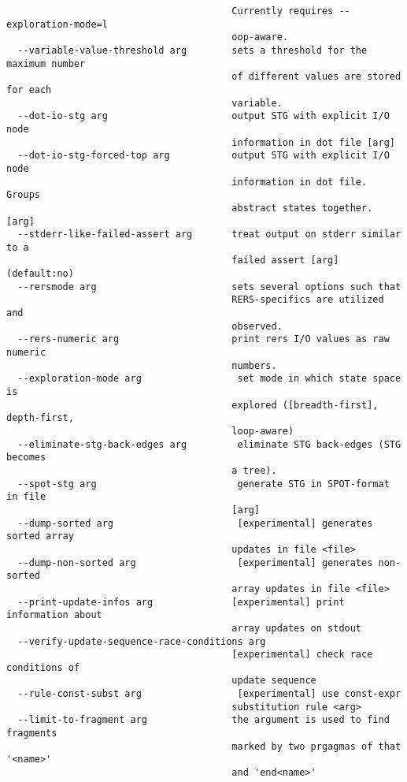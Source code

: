 \documentclass[natbib]{article}
\begin{document}
\begin{verbatim}
                                        Currently requires --exploration-mode=l
                                        oop-aware.
  --variable-value-threshold arg        sets a threshold for the maximum number
                                        of different values are stored for each
                                        variable.
  --dot-io-stg arg                      output STG with explicit I/O node 
                                        information in dot file [arg]
  --dot-io-stg-forced-top arg           output STG with explicit I/O node 
                                        information in dot file. Groups 
                                        abstract states together. [arg]
  --stderr-like-failed-assert arg       treat output on stderr similar to a 
                                        failed assert [arg] (default:no)
  --rersmode arg                        sets several options such that 
                                        RERS-specifics are utilized and 
                                        observed.
  --rers-numeric arg                    print rers I/O values as raw numeric 
                                        numbers.
  --exploration-mode arg                 set mode in which state space is 
                                        explored ([breadth-first], depth-first,
                                        loop-aware)
  --eliminate-stg-back-edges arg         eliminate STG back-edges (STG becomes 
                                        a tree).
  --spot-stg arg                         generate STG in SPOT-format in file 
                                        [arg]
  --dump-sorted arg                      [experimental] generates sorted array 
                                        updates in file <file>
  --dump-non-sorted arg                  [experimental] generates non-sorted 
                                        array updates in file <file>
  --print-update-infos arg              [experimental] print information about 
                                        array updates on stdout
  --verify-update-sequence-race-conditions arg
                                        [experimental] check race conditions of
                                        update sequence
  --rule-const-subst arg                 [experimental] use const-expr 
                                        substitution rule <arg>
  --limit-to-fragment arg               the argument is used to find fragments 
                                        marked by two prgagmas of that '<name>'
                                        and 'end<name>'

\end{verbatim}
\end{document}

